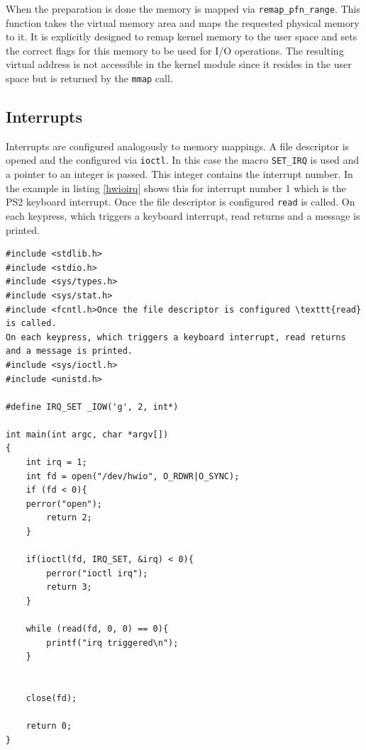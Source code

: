 \documentclass[
a4paper,
11pt,
twoside
]{report}
\begin{document}
		When the preparation is done the memory is mapped via \texttt{remap\_pfn\_range}.
		This function takes the virtual memory area and maps the requested physical memory to it.
		It is explicitly designed to remap kernel memory to the user space and sets the correct flags for this memory to be used for I/O operations.
		The resulting virtual address is not accessible in the kernel module since it resides in the user space but is returned by the \texttt{mmap} call.
		
		\subsection{Interrupts}
		
		Interrupts are configured analogously to memory mappings.
		A file descriptor is opened and the configured via \texttt{ioctl}.
		In this case the macro \texttt{SET\_IRQ} is used and a pointer to an integer is passed.
		This integer contains the interrupt number.
		In the example in listing \ref{hwioirq} shows this for interrupt number 1 which is the PS2 keyboard interrupt.
		Once the file descriptor is configured \texttt{read} is called.
		On each keypress, which triggers a keyboard interrupt, read returns and a message is printed.
		
		\begin{lstlisting}[basicstyle=\ttfamily\footnotesize]
#include <stdlib.h>
#include <stdio.h>
#include <sys/types.h>
#include <sys/stat.h>
#include <fcntl.h>Once the file descriptor is configured \texttt{read} is called.
On each keypress, which triggers a keyboard interrupt, read returns and a message is printed.
#include <sys/ioctl.h>
#include <unistd.h>
		
#define IRQ_SET _IOW('g', 2, int*)

int main(int argc, char *argv[])
{  		
	int irq = 1;
	int fd = open("/dev/hwio", O_RDWR|O_SYNC);
	if (fd < 0){ 
	perror("open");
		return 2;
	}   
		
	if(ioctl(fd, IRQ_SET, &irq) < 0){ 
		perror("ioctl irq");
		return 3;
	}   
		
	while (read(fd, 0, 0) == 0){ 
		printf("irq triggered\n");
	}   
		
		
	close(fd);
		
	return 0;
}
		
		\end{lstlisting}
		
\end{document}
